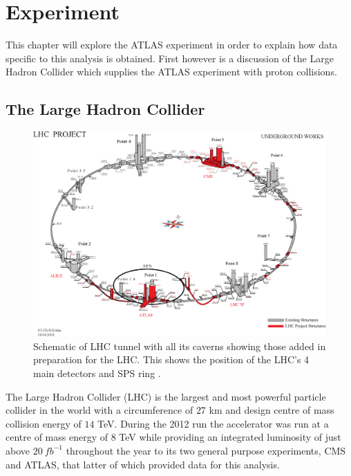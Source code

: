 \chapter{Experiment}

	This chapter will explore the ATLAS experiment in order to explain how data specific to this analysis is obtained. First however is a discussion of the Large Hadron Collider which supplies the ATLAS experiment with proton collisions.

\section{The Large Hadron Collider}

	\begin{figure}[h!]
        \begin{center}
            \includegraphics[scale=0.6]{images/LHCUnder.eps}
        \end{center}
        \caption{Schematic of LHC tunnel with all its caverns showing those added in preparation for the LHC. This shows the position of the LHC's 4 main detectors and SPS ring \cite{1367-2630-9-9-335}.}
        \label{fig:experimentLHC}
    \end{figure}

	The Large Hadron Collider (LHC) \cite{Brüning:782076} is the largest and most powerful particle collider in the world with a circumference of $27$ km and design centre of mass collision energy of $14$ TeV. During the 2012 run the accelerator was run at a centre of mass energy of $8$ TeV while providing an integrated luminosity of just above $20~fb^{-1}$ throughout the year to its two general purpose experiments, CMS and ATLAS, that latter of which provided data for this analysis.
	
